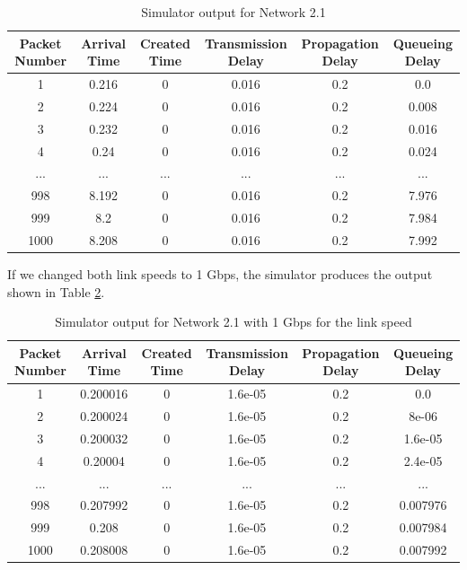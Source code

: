 \documentclass[11pt]{article}
\begin{document}
\begin{description}
\begin{table}[H]
\begin{center}
\caption{Simulator output for Network 2.1}
\label{tbl2.1}
\begin{tabular}{cccccc}
  \toprule
  Packet Number & Arrival Time & Created Time & Transmission Delay & Propagation Delay & Queueing Delay\\
  \midrule
  1 & 0.216 & 0 & 0.016 & 0.2 & 0.0\\
  2 & 0.224 & 0 & 0.016 & 0.2 & 0.008\\
  3 & 0.232 & 0 & 0.016 & 0.2 & 0.016\\
  4 & 0.24 & 0 & 0.016 & 0.2 & 0.024\\
  ... & ... & ... & ... & ... & ...\\
  998 & 8.192 & 0 & 0.016 & 0.2 & 7.976\\
  999 & 8.2 & 0 & 0.016 & 0.2 & 7.984\\
  1000 & 8.208 & 0 & 0.016 & 0.2 & 7.992\\
  \bottomrule
\end{tabular}
\end{center}
\end{table}

\smallskip

If we changed both link speeds to 1 Gbps, the simulator produces the output shown in Table \ref{tbl2.1G}.

\smallskip

\begin{table}[H]
\begin{center}
\caption{Simulator output for Network 2.1 with 1 Gbps for the link speed}
\label{tbl2.1G}
\begin{tabular}{cccccc}
  \toprule
  Packet Number & Arrival Time & Created Time & Transmission Delay & Propagation Delay & Queueing Delay\\
  \midrule
  1 & 0.200016 & 0 & 1.6e-05 & 0.2 & 0.0\\
  2 & 0.200024 & 0 & 1.6e-05 & 0.2 & 8e-06\\
  3 & 0.200032 & 0 & 1.6e-05 & 0.2 & 1.6e-05\\
  4 & 0.20004 & 0 & 1.6e-05 & 0.2 & 2.4e-05\\
  ... & ... & ... & ... & ... & ...\\
  998 & 0.207992 & 0 & 1.6e-05 & 0.2 & 0.007976\\
  999 & 0.208 & 0 & 1.6e-05 & 0.2 & 0.007984\\
  1000 & 0.208008 & 0 & 1.6e-05 & 0.2 & 0.007992\\
  \bottomrule
\end{tabular}
\end{center}
\end{table}


\end{description}
\end{document}
